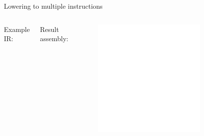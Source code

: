 
\begin{frame}{Lowering to multiple instructions}

\begin{columns}[t]
    Example IR:

    Result assembly:
    \begin{figure}
        \vspace{-5ex}
        \includegraphics[width = 0.78\textwidth]{examples/ex5/ex5-post-isel.pdf}
    \end{figure}
\end{columns}

\end{frame}
